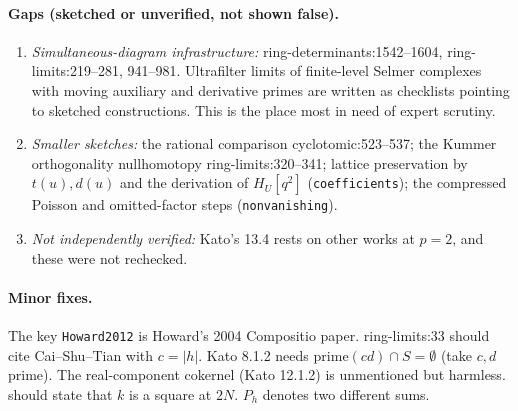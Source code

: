 \documentclass[11pt]{article}
\theoremstyle{remark}
\newcommand{\src}[2]{\textsf{\small #1:#2}}
\begin{document}
\paragraph{Gaps (sketched or unverified, not shown false).}
\begin{enumerate}
\item \emph{Simultaneous-diagram infrastructure:}
 \src{ring-determinants}{1542--1604}, \src{ring-limits}{219--281,
 941--981}. Ultrafilter limits of finite-level Selmer complexes with moving
 auxiliary and derivative primes are written as checklists pointing to
 sketched constructions. This is the place most in need of expert scrutiny.
\item \emph{Smaller sketches:} the rational comparison
 \src{cyclotomic}{523--537}; the Kummer orthogonality nullhomotopy
 \src{ring-limits}{320--341}; lattice preservation by $t(u),d(u)$ and the
 derivation of $H_U[q^2]$ (\texttt{coefficients}); the compressed Poisson
 and omitted-factor steps (\texttt{nonvanishing}).
\item \emph{Not independently verified:} Kato's 13.4 rests on other works
 at $p=2$, and these were not rechecked.
\end{enumerate}

\paragraph{Minor fixes.} The key \texttt{Howard2012} is Howard's 2004
Compositio paper. \src{ring-limits}{33} should cite Cai--Shu--Tian with
$c=|h|$. Kato 8.1.2 needs $\mathrm{prime}(cd)\cap S=\emptyset$ (take $c,d$
prime). The real-component cokernel (Kato 12.1.2) is unmentioned but
harmless.  should state that $k$ is a square at $2N$.
$P_h$ denotes two different sums.
\end{document}
